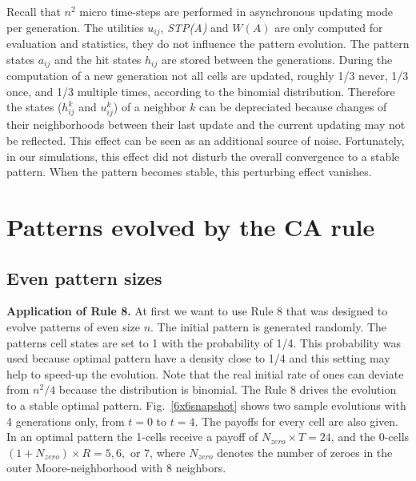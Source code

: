 \documentclass[10pt,a4paper]{article}  %
\begin{document}
Recall that $n^2$ micro time-steps are performed  in asynchronous updating mode per generation.
The utilities $u_{ij}$, \textit{STP(A)} and $W(A)$ are only computed for evaluation and statistics, they do not
influence the pattern evolution. 
The pattern states $a_{ij}$ and the hit states $h_{ij}$
are stored between the generations.
During the computation of a new generation not all cells are updated,
roughly 1/3 never, 1/3 once, and 1/3 multiple times, according to the binomial distribution. 
Therefore the states ($h_{ij}^k$ and  $u_{ij}^k$) of a neighbor $k$  
can be depreciated because changes of their neighborhoods between their last update and the current 
updating may not be reflected. 
This effect can be seen as an additional source of noise. 
Fortunately, in our simulations, this  effect did not disturb the overall convergence to 
a stable pattern.
When the pattern becomes stable, this perturbing effect vanishes. 


\section{Patterns evolved by the CA rule}
\subsection{Even pattern sizes}

\textbf{Application of Rule 8.}
At first we want to use Rule 8 that was designed to evolve patterns of even size $n$.  %
The initial pattern is generated randomly. 
The patterns cell states are set to 1 with the probability of 1/4.
This probability was used because  optimal pattern have 
a density close to 1/4 and this setting may help to speed-up the evolution. 
Note that the real initial rate of ones can deviate from $n^2/4$
because the distribution is binomial. 
The Rule 8 drives the evolution to a stable optimal pattern. 
Fig.~\ref{6x6snapshot}
shows two sample evolutions with 4 generations only, from $t=0$ to $t=4$.
The payoffs for every cell are  also given. 
In an optimal pattern the 1-cells receive a payoff of $N_{zero} \times T =24$,
and the 0-cells $(1+N_{zero})\times R=5,6,$ or $7$,
where $N_{zero}$ denotes the number of zeroes in the outer Moore-neighborhood
with 8 neighbors. 
\end{document}
